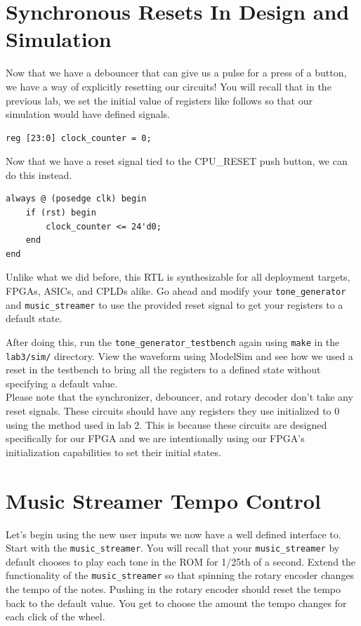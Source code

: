 \documentclass[11pt]{article}
\begin{document}
\section{Synchronous Resets In Design and Simulation}
Now that we have a debouncer that can give us a pulse for a press of a button, we have a way of explicitly resetting our circuits! You will recall that in the previous lab, we set the initial value of registers like follows so that our simulation would have defined signals.

\begin{verbatim}
reg [23:0] clock_counter = 0;
\end{verbatim}

Now that we have a reset signal tied to the CPU\_RESET push button, we can do this instead.

\begin{verbatim}
always @ (posedge clk) begin
	if (rst) begin
		clock_counter <= 24'd0;
	end
end
\end{verbatim}

Unlike what we did before, this RTL is synthesizable for all deployment targets, FPGAs, ASICs, and CPLDs alike. Go ahead and modify your \verb|tone_generator| and \verb|music_streamer| to use the provided reset signal to get your registers to a default state.

After doing this, run the \verb|tone_generator_testbench| again using \verb|make| in the \verb|lab3/sim/| directory. View the waveform using ModelSim and see how we used a reset in the testbench to bring all the registers to a defined state without specifying a default value.\\

Please note that the synchronizer, debouncer, and rotary decoder don't take any reset signals. These circuits should have any registers they use initialized to 0 using the method used in lab 2. This is because these circuits are designed specifically for our FPGA and we are intentionally using our FPGA's initialization capabilities to set their initial states.

\section{Music Streamer Tempo Control}
Let's begin using the new user inputs we now have a well defined interface to. Start with the \verb|music_streamer|. You will recall that your \verb|music_streamer| by default chooses to play each tone in the ROM for 1/25th of a second. Extend the functionality of the \verb|music_streamer| so that spinning the rotary encoder changes the tempo of the notes. Pushing in the rotary encoder should reset the tempo back to the default value. You get to choose the amount the tempo changes for each click of the wheel.
\end{document}
